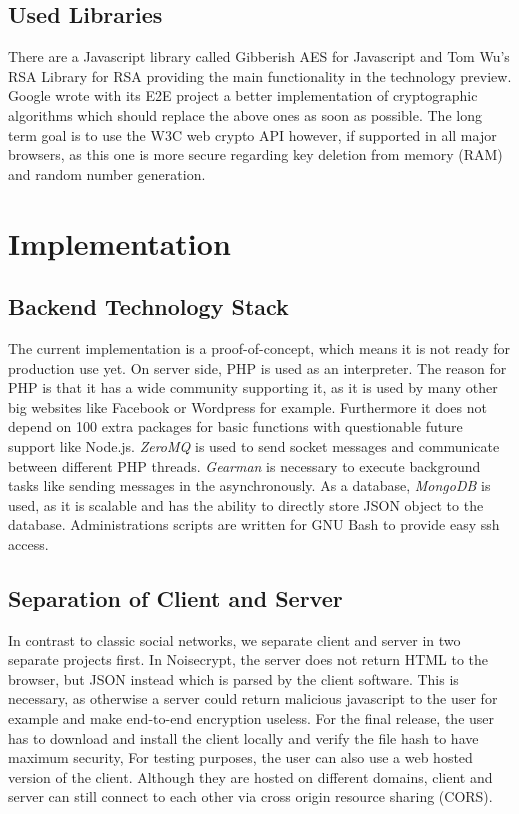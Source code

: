\documentclass{scrartcl}
\begin{document}
\subsection{Used Libraries}
There are a Javascript library called Gibberish AES for Javascript and Tom Wu's RSA Library for RSA providing the main functionality in the technology preview. Google wrote with its E2E project a better implementation of cryptographic algorithms which should replace the above ones as soon as possible. The long term goal is to use the W3C web crypto API however, if supported in all major browsers, as this one is more secure regarding key deletion from memory (RAM) and random number generation. 

\newpage
\section{Implementation}
\subsection{Backend Technology Stack}
The current implementation is a proof-of-concept, which means it is not ready for production use yet.
On server side, PHP is used as an interpreter. The reason for PHP is that it has a wide community supporting it, as it is used by many other big websites like Facebook or Wordpress for example. Furthermore it does not depend on 100 extra packages for basic functions with questionable future support like Node.js.
 \textit{ZeroMQ} is used to send socket messages and communicate between different PHP threads. \textit{Gearman} is necessary to execute background tasks like sending messages in the asynchronously. As a database, \textit{MongoDB} is used, as it is scalable and has the ability to directly store JSON object to the database.
Administrations scripts are written for GNU Bash to provide easy ssh access.



 \subsection{Separation of Client and Server}
In contrast to classic social networks, we separate client and server in two separate projects first. In Noisecrypt, the server does not return HTML to the browser, but JSON instead which is parsed by the client software. This is necessary, as otherwise a server could return malicious javascript to the user for example and make end-to-end encryption useless. For the final release, the user has to download and install the client locally and verify the file hash to have maximum security, For testing purposes, the user can also use a web hosted version of the client. Although they are hosted on different domains, client and server can still connect to each other via cross origin resource sharing (CORS).
\end{document}
